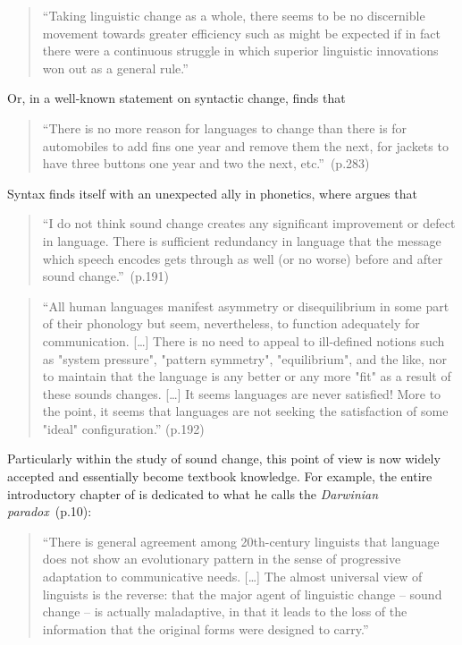 \begin{quote}
``Taking linguistic change as a whole, there seems to be no discernible movement towards greater efficiency such as might be expected if in fact there were a continuous struggle in which superior linguistic innovations won out as a general rule.''~\citep[p.69]{Greenberg1959}
\end{quote}

Or, in a well-known statement on syntactic change, \citet{Postal1968} finds that

\begin{quote}
``There is no more reason for languages to change than there is for automobiles to add fins one year and remove them the next, for jackets to have three buttons one year and two the next, etc.''~(p.283)
\end{quote}

Syntax finds itself with an unexpected ally in phonetics, where \citet{Ohala1989} argues that

\begin{quote}
``I do not think sound change creates any significant improvement or defect in language. There is sufficient redundancy in language that the message which speech encodes gets through as well (or no worse) before and after sound change.''~(p.191)
\end{quote}

\begin{quote}
``All human languages manifest asymmetry or disequilibrium in some part of their phonology but seem, nevertheless, to function adequately for communication. [\ldots] There is no need to appeal to ill-defined notions such as "system pressure", "pattern symmetry", "equilibrium", and the like, nor to maintain that the language is any better or any more "fit" as a result of these sounds changes. [\ldots] It seems languages are never satisfied! More to the point, it seems that languages are not seeking the satisfaction of some "ideal" configuration.'' (p.192)
\end{quote}

Particularly within the study of sound change, this point of view is now widely accepted and essentially become textbook knowledge. For example, the entire introductory chapter of \citet{Labov2001} is dedicated to what he calls the \emph{Darwinian paradox}~(p.10): 

\begin{quote}
``There is general agreement among 20th-century linguists that language does not show an evolutionary pattern in the sense of progressive adaptation to communicative needs. [\ldots] The almost universal view of linguists is the reverse: that the major agent of linguistic change -- sound change -- is actually maladaptive, in that it leads to the loss of the information that the original forms were designed to carry.''
\end{quote}

